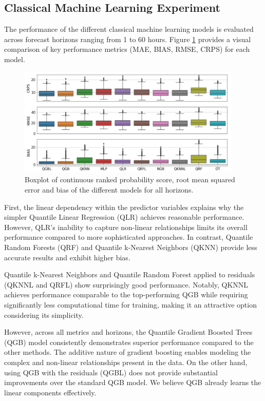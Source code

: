 \documentclass[12pt,a4paper]{book}
\begin{document}
\subsection{Classical Machine Learning Experiment}

The performance of the different classical machine learning models is evaluated across forecast horizons ranging from 1 to 60 hours. Figure \ref{figure:exp1_metrics} provides a visual comparison of key performance metrics (MAE, BIAS, RMSE, CRPS) for each model.

\begin{figure}[tbp]
  \centering
  \includegraphics[width=0.95\textwidth]{exp1_metrics_chart.png}
  \caption{\label{figure:exp1_metrics}
    Boxplot of continuous ranked probability score, root mean squared
    error and bias of the different models for all horizons.
  }
\end{figure}

First, the linear dependency within the predictor variables explains why the simpler Quantile Linear Regression (QLR) achieves reasonable performance. However, QLR's inability to capture non-linear relationships limits its overall performance compared to more sophisticated approaches. In contrast, Quantile Random Forests (QRF) and Quantile k-Nearest Neighbors (QKNN) provide less accurate results and exhibit higher bias. 

Quantile k-Nearest Neighbors and Quantile Random Forest applied to residuals (QKNNL and QRFL) show surprisingly good performance. Notably, QKNNL achieves performance comparable to the top-performing QGB while requiring significantly less computational time for training, making it an attractive option considering its simplicity. 

However, across all metrics and horizons, the Quantile Gradient Boosted Trees (QGB) model consistently demonstrates superior performance compared to the other methods. The additive nature of gradient boosting enables modeling the complex and non-linear relationships present in the data. On the other hand, using QGB with the residuals (QGBL) does not provide substantial improvements over the standard QGB model. We believe QGB already learns the linear components effectively.
\end{document}
